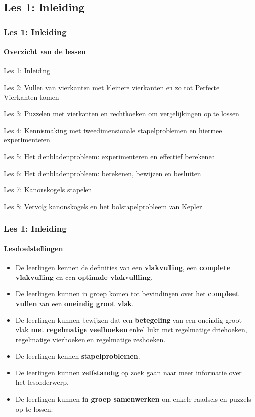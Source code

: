 \documentclass[dutch]{beamer}
\begin{document}
\subsection{Les 1: Inleiding}
\begin{frame}
\frametitle{Les 1: Inleiding}
\framesubtitle{Overzicht van de lessen}
\begin{list}{\quad}{}
\item {\color{blue}Les 1: Inleiding}
\item Les 2: Vullen van vierkanten met kleinere vierkanten en zo tot Perfecte Vierkanten komen
\item Les 3: Puzzelen met vierkanten en rechthoeken om vergelijkingen op te lossen
\item Les 4: Kennismaking met tweedimensionale stapelproblemen en hiermee experimenteren
\item Les 5: Het dienbladenprobleem: experimenteren en effectief berekenen
\item Les 6: Het dienbladenprobleem: berekenen, bewijzen en besluiten
\item Les 7: Kanonskogels stapelen
\item Les 8: Vervolg kanonskogels en het bolstapelprobleem van Kepler
\end{list}
\end{frame}

\begin{frame}
\frametitle{Les 1: Inleiding}
\framesubtitle{Lesdoelstellingen}
\begin{itemize}
\item De leerlingen kennen de definities van een \textbf{vlakvulling}, een \textbf{complete vlakvulling} en een \textbf{optimale vlakvullling}.
\item De leerlingen kunnen in groep komen tot bevindingen over het \textbf{compleet vullen} van een \textbf{oneindig groot vlak}.
\item De leerlingen kunnen bewijzen dat een \textbf{betegeling} van een oneindig groot vlak \textbf{met regelmatige veelhoeken} enkel lukt met regelmatige driehoeken, regelmatige vierhoeken en regelmatige zeshoeken.
\item De leerlingen kennen \textbf{stapelproblemen}.
\item De leerlingen kunnen \textbf{zelfstandig} op zoek gaan naar meer informatie over het lesonderwerp.
\item De leerlingen kunnen \textbf{in groep samenwerken} om enkele raadsels en puzzels op te lossen.
\end{itemize}
\end{frame}
\end{document}
